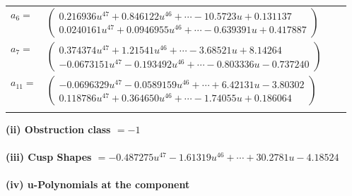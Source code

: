 \documentclass[1p]{elsarticle_modified}
\theoremstyle{definition}
\begin{document}
\begin{tabular}{m{7pt} m{180pt} m{7pt} m{180pt} }
\flushright $a_{6}=$&$\begin{pmatrix}0.216936 u^{47}+0.846122 u^{46}+\cdots-10.5723 u+0.131137\\0.0240161 u^{47}+0.0946955 u^{46}+\cdots-0.639391 u+0.417887\end{pmatrix}$ \\
\flushright $a_{7}=$&$\begin{pmatrix}0.374374 u^{47}+1.21541 u^{46}+\cdots-3.68521 u+8.14264\\-0.0673151 u^{47}-0.193492 u^{46}+\cdots-0.803336 u-0.737240\end{pmatrix}$ \\
\flushright $a_{11}=$&$\begin{pmatrix}-0.0696329 u^{47}-0.0589159 u^{46}+\cdots+6.42131 u-3.80302\\0.118786 u^{47}+0.364650 u^{46}+\cdots-1.74055 u+0.186064\end{pmatrix}$\\&\end{tabular}
\flushleft \textbf{(ii) Obstruction class $= -1$}\\~\\
\flushleft \textbf{(iii) Cusp Shapes $= -0.487275 u^{47}-1.61319 u^{46}+\cdots+30.2781 u-4.18524$}\\~\\
\newpage\renewcommand{\arraystretch}{1}
\flushleft \textbf{(iv) u-Polynomials at the component}\newline \\
\end{document}
